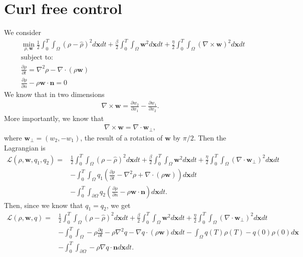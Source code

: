 \documentclass[11pt, a4paper]{article}
\theoremstyle{definition}
\newcommand{\w}{\mathbf{w}}
\newcommand{\x}{\mathbf{x}}
\newcommand{\n}{\mathbf{n}}
\newcommand{\hr}{\widehat \rho}
\begin{document}
\section{Curl free control}	
We consider
\begin{align*}
	&\min_{\rho, \w} \frac{1}{2}\int_0^T \int_\Omega \left(\rho - \hr\right)^2 d\x dt + \frac{\beta}{2}\int_0^T \int_\Omega \w^2 d\x dt + \frac{\eta}{2}\int_0^T \int_\Omega \left(\nabla \times \w \right)^2 d\x dt\\
	&\text{subject to:}\\
	& \frac{\partial \rho}{\partial t} = \nabla^2 \rho - \nabla \cdot \left(\rho \w\right)\\
	& \frac{\partial \rho}{\partial n} - \rho \w \cdot \n = 0
\end{align*}
We know that in two dimensions
\begin{align*}
    \nabla \times \w = \frac{\partial w_2}{\partial x_1}  - \frac{\partial w_1}{\partial x_2}.
\end{align*}
More importantly, we know that
\begin{align}\label{eqn:CurlRel}
	\nabla \times \w = \nabla \cdot  \w_\bot,
\end{align}
where $\w_\bot = (w_2 , -w_1)$, the result of a rotation of $\w$ by $\pi/2$.
Then the Lagrangian is
\begin{align*}
	\mathcal L (\rho, \w ,q_1, q_2) =& \frac{1}{2}\int_0^T \int_\Omega \left(\rho - \hr\right)^2 d\x dt + \frac{\beta}{2}\int_0^T \int_\Omega \w^2 d\x dt + \frac{\eta}{2}\int_0^T \int_\Omega \left(\nabla \cdot  \w_\bot \right)^2 d\x dt\\
	&- \int_0^T \int_\Omega q_1 \left(\frac{\partial \rho}{\partial t} - \nabla^2 \rho + \nabla \cdot \left(\rho \w\right) \right) d \x dt \\
	&- \int_0^T \int_{\partial \Omega} q_2\left(\frac{\partial \rho}{\partial n} - \rho \w \cdot \n \right) d\x dt.
\end{align*}
Then, since we know that $q_1 = q_2$, we get
\begin{align*}
	\mathcal L (\rho, \w ,q) =& \frac{1}{2}\int_0^T \int_\Omega \left(\rho - \hr\right)^2 d\x dt + \frac{\beta}{2}\int_0^T \int_\Omega \w^2 d\x dt + \frac{\eta}{2}\int_0^T \int_\Omega \left(\nabla \cdot  \w_\bot\right)^2 d\x dt\\
	&- \int_0^T \int_\Omega -\rho\frac{\partial q}{\partial t} - \rho \nabla^2 q - \nabla q \cdot \left(\rho \w\right) d \x dt  - \int_\Omega q(T) \rho(T) - q(0) \rho(0) d\x\\
	&- \int_0^T \int_{\partial \Omega}  - \rho \nabla q \cdot \n  d\x dt.
\end{align*}
\end{document}
